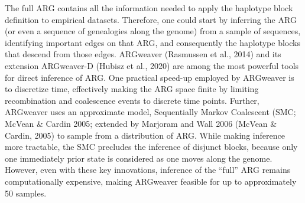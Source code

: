 \documentclass[twocolumn]{bmcart}%
\begin{document}
The full ARG contains all the information needed to apply the haplotype block definition to empirical datasets. Therefore, one could start by inferring the ARG (or even a sequence of genealogies along the genome) from a sample of sequences, identifying important edges on that ARG, and consequently the haplotype blocks that descend from those edges. ARGweaver (Rasmussen et al., 2014) and its extension ARGweaver-D (Hubisz et al., 2020) are among the most powerful tools for direct inference of ARG. One practical speed-up employed by ARGweaver is to discretize time, effectively making the ARG space finite by limiting recombination and coalescence events to discrete time points. Further, ARGweaver uses an approximate model, Sequentially Markov Coalescent (SMC; McVean \& Cardin 2005; extended by Marjoram and Wall 2006 (McVean \& Cardin, 2005) to sample from a distribution of ARG. While making inference more tractable, the SMC precludes the inference of disjunct blocks, because only one immediately prior state is considered as one moves along the genome. However, even with these key innovations, inference of the “full” ARG remains computationally expensive, making ARGweaver feasible for up to approximately 50 samples.
\end{document}
